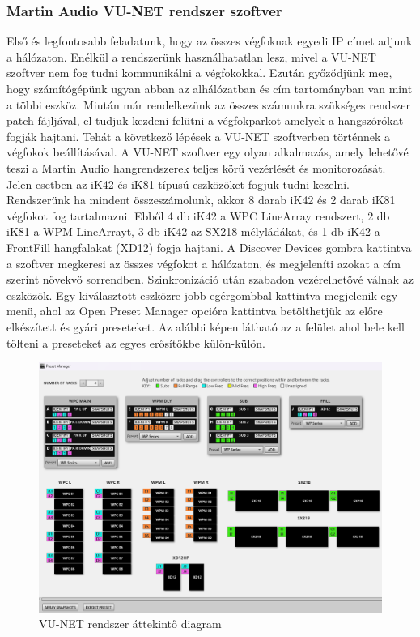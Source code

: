 \subsubsection{Martin Audio VU-NET rendszer szoftver \cite{VUNETUSERGUIDE}}
Első és legfontosabb feladatunk, hogy az összes végfoknak egyedi IP címet adjunk a hálózaton.
Enélkül a rendszerünk használhatatlan lesz, mivel a VU-NET szoftver nem fog tudni kommunikálni a végfokokkal.
Ezután győződjünk meg, hogy számítógépünk ugyan abban az alhálózatban és cím tartományban van mint a többi eszköz.
Miután már rendelkezünk az összes számunkra szükséges rendszer patch fájljával,
el tudjuk kezdeni felütni a végfokparkot amelyek a hangszórókat fogják hajtani.
Tehát a következő lépések a VU-NET szoftverben történnek a végfokok beállításával.
A VU-NET szoftver egy olyan alkalmazás, amely lehetővé teszi a Martin Audio hangrendszerek teljes körű vezérlését és monitorozását.
Jelen esetben az iK42 és iK81 típusú eszközöket fogjuk tudni kezelni.
Rendszerünk ha mindent összeszámolunk, akkor 8 darab iK42 és 2 darab iK81 végfokot fog tartalmazni.
Ebből 4 db iK42 a WPC LineArray rendszert, 2 db iK81 a WPM LineArrayt, 3 db iK42
az SX218 mélyládákat, és 1 db iK42 a FrontFill hangfalakat (XD12) fogja hajtani.
A Discover Devices gombra kattintva a szoftver megkeresi az összes végfokot a hálózaton, és megjeleníti azokat a
cím szerint növekvő sorrendben. Szinkronizáció után szabadon vezérelhetővé válnak az eszközök.
Egy kiválasztott eszközre jobb egérgombbal kattintva megjelenik egy menü, ahol az Open Preset Manager opcióra kattintva
betölthetjük az előre elkészített és gyári preseteket.
Az alábbi képen látható az a felület ahol bele kell tölteni a preseteket az egyes erősítőkbe külön-külön.
\begin{figure}[H]
	\centering
	\includegraphics[width=\textwidth, keepaspectratio]{figures/vunet_systemdiagram_overall.png}
	\caption{VU-NET rendszer áttekintő diagram}\label{fig:vunet_systemdiagram_overall}
\end{figure}
